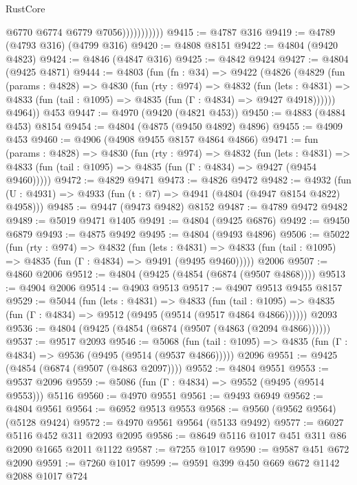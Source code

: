 \begin{lexlean}{RustCore}
\begin{coremodule}
                          @6770
                          @6774
                          @6779
                          @7056)))))))))))
@9415 := @4787 @316
@9419 := @4789 (@4793 @316) (@4799 @316)
@9420 := @4808 @8151
@9422 := @4804 (@9420 @4823)
@9424 := @4846 (@4847 @316)
@9425 := @4842 @9424
@9427 := @4804 (@9425 @4871)
@9444 := @4803
    (fun (fn : @34) =>
    @9422
      (@4826
        (@4829
          (fun (params : @4828) =>
          @4830
            (fun (rty : @974) =>
            @4832
              (fun (lets : @4831) =>
              @4833 (fun (tail : @1095) => @4835 (fun (Γ : @4834) => @9427 @4918))))))
        @4964))
    @453
@9447 := @4970 (@9420 (@4821 @453))
@9450 := @4883 (@4884 @453) @8154
@9454 := @4804 (@4875 (@9450 @4892) @4896)
@9455 := @4909 @453
@9460 := @4906 (@4908 @9455 @8157 @4864 @4866)
@9471 := fun (params : @4828) =>
  @4830
    (fun (rty : @974) =>
    @4832
      (fun (lets : @4831) =>
      @4833 (fun (tail : @1095) => @4835 (fun (Γ : @4834) => @9427 (@9454 @9460)))))
@9472 := @4829 @9471
@9473 := @4826 @9472
@9482 := @4932 (fun (U : @4931) => @4933 (fun (t : @7) => @4941 (@4804 (@4947 @8154 @4822) @4958)))
@9485 := @9447 (@9473 @9482) @8152
@9487 := @4789 @9472 @9482
@9489 := @5019 @9471 @1405
@9491 := @4804 (@9425 @6876)
@9492 := @9450 @6879
@9493 := @4875 @9492
@9495 := @4804 (@9493 @4896)
@9506 := @5022
    (fun (rty : @974) =>
    @4832
      (fun (lets : @4831) =>
      @4833 (fun (tail : @1095) => @4835 (fun (Γ : @4834) => @9491 (@9495 @9460)))))
    @2006
@9507 := @4860 @2006
@9512 := @4804 (@9425 (@4854 (@6874 (@9507 @4868))))
@9513 := @4904 @2006
@9514 := @4903 @9513
@9517 := @4907 @9513 @9455 @8157
@9529 := @5044
    (fun (lets : @4831) =>
    @4833
      (fun (tail : @1095) => @4835 (fun (Γ : @4834) => @9512 (@9495 (@9514 (@9517 @4864 @4866))))))
    @2093
@9536 := @4804 (@9425 (@4854 (@6874 (@9507 (@4863 (@2094 @4866))))))
@9537 := @9517 @2093
@9546 := @5068
    (fun (tail : @1095) => @4835 (fun (Γ : @4834) => @9536 (@9495 (@9514 (@9537 @4866)))))
    @2096
@9551 := @9425 (@4854 (@6874 (@9507 (@4863 @2097))))
@9552 := @4804 @9551
@9553 := @9537 @2096
@9559 := @5086 (fun (Γ : @4834) => @9552 (@9495 (@9514 @9553))) @5116
@9560 := @4970 @9551
@9561 := @9493 @6949
@9562 := @4804 @9561
@9564 := @6952 @9513 @9553
@9568 := @9560 (@9562 @9564) (@5128 @9424)
@9572 := @4970 @9561 @9564 (@5133 @9492)
@9577 := @6027 @5116 @452 @311 @2093 @2095
@9586 := @8649 @5116 @1017 @451 @311 @86 @2090 @1665 @2011 @1122
@9587 := @7255 @1017
@9590 := @9587 @451 @672 @2090
@9591 := @7260 @1017
@9599 := @9591 @399 @450 @669 @672 @1142 @2088 @1017 @724

\end{coremodule}
\end{lexlean}
